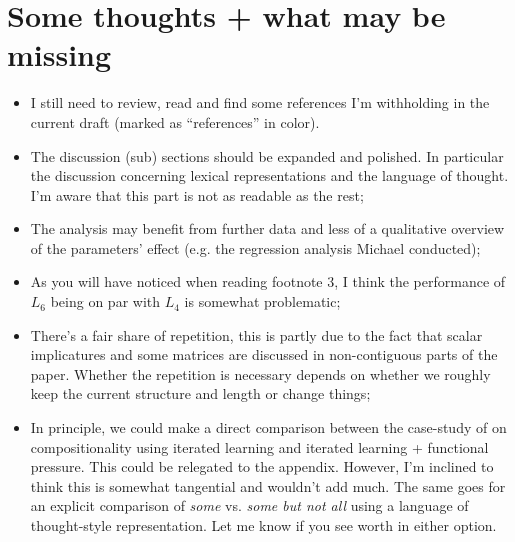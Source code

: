 \documentclass[a4paper]{article}
\newcommand{\hl}[1]{\textcolor[rgb]{.8,.33,.0}{#1}}%
\begin{document}
\section{Some thoughts + what may be missing}
\begin{itemize}
  \item I still need to review, read and find some references I'm withholding in the current draft (marked as ``\hl{references}'' in color). 
  \item The discussion (sub) sections should be expanded and polished. In particular the discussion concerning lexical representations and the language of thought. I'm aware that this part is not as readable as the rest;
  \item The analysis may benefit from further data and less of a qualitative overview of the parameters' effect (e.g. the regression analysis Michael conducted);
  \item As you will have noticed when reading footnote $3$, I think the performance of $L_6$ being on par with $L_4$ is somewhat problematic;
  \item There's a fair share of repetition, this is partly due to the fact that scalar implicatures and some matrices are discussed in non-contiguous parts of the paper. Whether the repetition is necessary depends on whether we roughly keep the current structure and length or change things;
  \item In principle, we could make a direct comparison between the case-study of \citet{griffiths+kalish:2007} on compositionality using iterated learning and iterated learning + functional pressure. This could be relegated to the appendix. However, I'm inclined to think this is somewhat tangential and wouldn't add much. The same goes for an explicit comparison of {\em some} vs. {\em some but not all} using a language of thought-style representation. Let me know if you see worth in either option.
\end{itemize}
\end{document}
